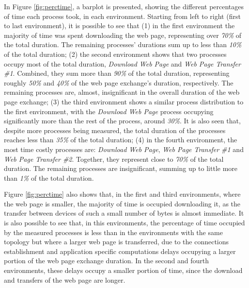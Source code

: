 In Figure \ref{fig:perctime}, a barplot is presented, showing the different percentages of time each process took, in each environment. Starting from left to right (first to last environment), it is possible to see that (1) in the first environment the majority of time was spent downloading the web page, representing over \textit{70\%} of the total duration. The remaining processes' durations sum up to less than \textit{10\%} of the total duration; (2) the second environment shows that two processes occupy most of the total duration, \textit{Download Web Page} and \textit{Web Page Transfer \#1}. Combined, they sum more than \textit{90\%} of the total duration, representing roughly \textit{50\%} and \textit{40\%} of the web page exchange's duration, respectively. The remaining processes are, almost, insignificant in the overall duration of the web page exchange; (3) the third environment shows a similar process distribution to the first environment, with the \textit{Download Web Page} process occupying significantly more than the rest of the process, around \textit{30\%}. It is also seen that, despite more processes being measured, the total duration of the processes reaches less than \textit{35\%} of the total duration; (4) in the fourth environment, the most time costly processes are: \textit{Download Web Page}, \textit{Web Page Transfer \#1} and \textit{Web Page Transfer \#2}. Together, they represent close to \textit{70\%} of the total duration. The remaining processes are insignificant, summing up to little more than \textit{1\%} of the total duration.

Figure \ref{fig:perctime} also shows that, in the first and third environments, where the web page is smaller, the majority of time is occupied downloading it, as the transfer between devices of such a small number of bytes is almost immediate. It is also possible to see that, in this environments, the percentage of time occupied by the measured processes is less than in the environments with the same topology but where a larger web page is transferred, due to the connections establishment and application specific computations delays occupying a larger portion of the web page exchange duration. In the second and fourth environments, these delays occupy a smaller portion of time, since the download and transfers of the web page are longer.

